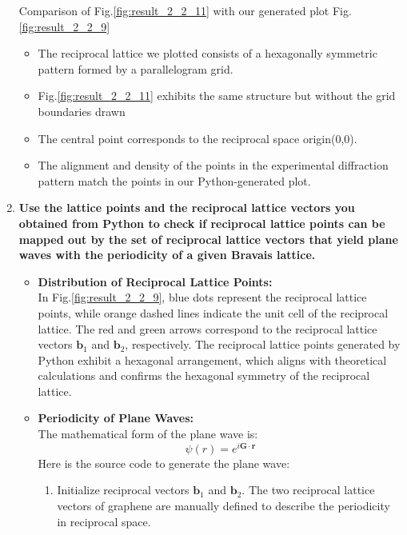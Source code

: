 \documentclass[12pt,a4paper]{article}
\begin{document}
\begin{CJK}{UTF8}{bkai}
\begin{enumerate}
    Comparison of Fig.\ref{fig:result_2_2_11} with our generated plot Fig.\ref{fig:result_2_2_9}
    \begin{itemize}
        \item The reciprocal lattice we plotted consists of a hexagonally symmetric pattern formed by a parallelogram grid.
        \item Fig.\ref{fig:result_2_2_11} exhibits the same structure but without the grid boundaries drawn
        \item The central point corresponds to the reciprocal space origin(0,0).
        \item The alignment and density of the points in the experimental diffraction pattern match the points in our Python-generated plot.
    \end{itemize}
    \clearpage
    \item \textbf{Use the lattice points and the reciprocal lattice vectors you obtained from Python to check if reciprocal lattice points can be mapped out by the set of reciprocal lattice vectors that yield plane waves with the periodicity of a given Bravais lattice.}\\
    \begin{itemize}
        \item \textbf{Distribution of Reciprocal Lattice Points:}\\
        In Fig.\ref{fig:result_2_2_9}, blue dots represent the reciprocal lattice points, while orange dashed lines indicate the unit cell of the reciprocal lattice. The red and green arrows correspond to the reciprocal lattice vectors $\mathbf{b}_1$ and $\mathbf{b}_2$, respectively. The reciprocal lattice points generated by Python exhibit a hexagonal arrangement, which aligns with theoretical calculations and confirms the hexagonal symmetry of the reciprocal lattice.
        \item \textbf{Periodicity of Plane Waves:}\\
        The mathematical form of the plane wave is:
        \begin{equation}
            \psi(r) = e^{i\mathbf{G}\cdot\mathbf{r}}
        \end{equation}
        Here is the source code to generate the plane wave:
        \begin{enumerate}
            \item Initialize reciprocal vectors $\mathbf{b}_1$ and $\mathbf{b}_2$. The two reciprocal lattice vectors of graphene are manually defined to describe the periodicity in reciprocal space.

\end{enumerate}
\end{itemize}
\end{enumerate}
\end{CJK}
\end{document}
